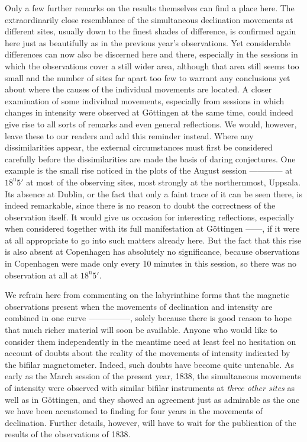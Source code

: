 Only a few further remarks on the results themselves can find a place here. The extraordinarily close resemblance of the simultaneous declination movements at different sites, usually down to the finest shades of difference, is confirmed again here just as beautifully as in the previous year’s observations. Yet considerable differences can now also be discerned here and there, especially in the sessions in which the observations cover a still wider area, although that area still seems too small and the number of sites far apart too few to warrant any conclusions yet about where the causes of the individual movements are located. A closer examination of some individual movements, especially from sessions in which changes in intensity were observed at Göttingen at the same time, could indeed give rise
to all sorts of remarks and even general reflections. We would, however, leave these to our readers and add this reminder instead. Where any dissimilarities appear, the external circumstances must first be considered carefully before the dissimilarities are made the basis of daring conjectures. One example is the small rise noticed in the plots of the August session ---\quad---\quad---\quad--- at $18^{\mathrm u}5'$ at most of the observing sites, most strongly at the northernmost, Uppsala. Its absence at Dublin, or the fact that only a faint trace of it can be seen there, is indeed remarkable, since there is no reason to doubt the correctness of the observation itself. It would give us occasion for interesting reflections, especially when considered together with its full manifestation at Göttingen ---\quad---, if it were at all appropriate to go into such matters already here. But the fact that this rise is also absent at Copenhagen has absolutely no significance, because observations in Copenhagen were made only every 10 minutes in this session, so there was no observation at all at $18^{\mathrm u}5'$.

We refrain here from commenting on the labyrinthine forms that the magnetic observations present when the movements of declination and intensity are combined in one curve ---\quad---\quad---\quad---\quad---, solely because there is good reason to hope that much richer material will soon be available. Anyone who would like to consider them independently in the meantime need at least feel no hesitation on account of doubts about the reality of the movements of intensity indicated by the bifilar magnetometer. Indeed, such doubts have become quite untenable. As early as the March session of the present year, 1838, the simultaneous movements of intensity were observed with similar bifilar instruments at \textit{three other sites} as well as in Göttingen, and they showed an agreement just as admirable as the one we have been accustomed to finding for four years in the movements of declination. Further details, however, will have to wait for the publication of the results of the observations of 1838.

